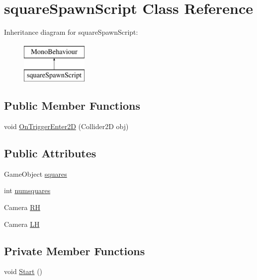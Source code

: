 \hypertarget{classsquare_spawn_script}{\section{square\-Spawn\-Script Class Reference}
\label{classsquare_spawn_script}
}
Inheritance diagram for square\-Spawn\-Script\-:\begin{figure}[H]
\begin{center}
\leavevmode
\includegraphics[height=2.000000cm]{classsquare_spawn_script}
\end{center}
\end{figure}
\subsection*{Public Member Functions}
\begin{DoxyCompactItemize}
\item 
void \hyperlink{classsquare_spawn_script_a072454e82d37b10169a363717acfc2be}{On\-Trigger\-Enter2\-D} (Collider2\-D obj)
\end{DoxyCompactItemize}
\subsection*{Public Attributes}
\begin{DoxyCompactItemize}
\item 
Game\-Object \hyperlink{classsquare_spawn_script_a353637659973cde399b46b194b30eb2e}{squares}
\item 
int \hyperlink{classsquare_spawn_script_aee81b01036a29f961a113a21183173e3}{numsquares}
\item 
Camera \hyperlink{classsquare_spawn_script_acc39770a5d684a4b5e1057b832dc979d}{R\-H}
\item 
Camera \hyperlink{classsquare_spawn_script_abf8f64837c29453bfe6231d48b06b483}{L\-H}
\end{DoxyCompactItemize}
\subsection*{Private Member Functions}
\begin{DoxyCompactItemize}
\item 
void \hyperlink{classsquare_spawn_script_adfc7e870640ae864df5da2c89c275c21}{Start} ()
\end{DoxyCompactItemize}


